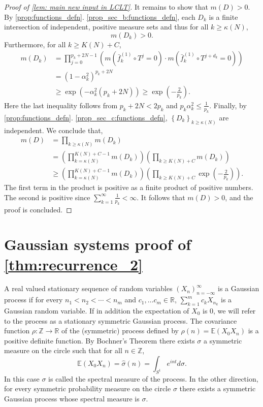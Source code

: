 \documentclass[12pt,reqno]{amsart}
\newcommand{\Z}{\mathbb{Z}}
\newcommand{\R}{\mathbb{R}}
\theoremstyle{definition}
\begin{document}
\begin{proof}[Proof of \cref{lem: main new input in LCLT}]
It remains to show that $m(D)>0$. By \cref{prop:functions_defn}. \ref{prop_sec_b:functions_defn}, each $D_k$ is a finite intersection of independent, positive measure sets and thus for all $k\geq \kappa(N)$, 
\[
m\left(D_k\right)>0. 
\]
Furthermore, for all $k\geq K(N)+C$,
\begin{align*}
m\left(D_k\right)&=\prod_{j=0}^{p_k+2N-1}\left(m\left(\bar{f}_k^{(1)}\circ T^{j}=0\right)\cdot m\left(\bar{f}_k^{(1)}\circ T^{j+d_k}=0\right)\right)\\
&=\left(1-\alpha_k^2\right)^{p_k+2N}\\
&\geq \exp\left(-\alpha_k^2(p_k+2N)\right)\geq \exp\left(-\frac{2}{p_k}\right).
\end{align*}
Here the last inequality follows from $p_k+2N<2p_k$ and $p_k\alpha_k^2\leq\frac{1}{p_k}$. Finally, by \cref{prop:functions_defn}. \ref{prop_sec_c:functions_defn}, $\left\{D_k\right\}_{k\geq \kappa(N)}$ are independent. We conclude that,
\begin{align*}
m(D)&=\prod_{k\geq \kappa(N)}m\left(D_k\right)\\
&=\left(\prod_{k= \kappa(N)}^{K(N)+C-1} m\left(D_k\right)\right)\left(\prod_{k\geq K(N)+C} m\left(D_k\right)\right)\\
&\geq \left(\prod_{k= \kappa(N)}^{K(N)+C-1} m\left(D_k\right)\right)\left(\prod_{k\geq K(N)+C} \exp\left(-\frac{2}{p_k}\right)\right).
\end{align*}
The first term in the product is positive as a finite product of positive numbers. The second is positive since $\sum_{k=1}^\infty\frac{1}{p_k}<\infty$. It follows that $m(D)>0$, and the proof is concluded. 
\end{proof}

\section{Gaussian systems proof of \cref{thm:recurrence_2}}\label{sec: Gaussian}

A real valued stationary sequence of random variables $\left(X_n\right)_{n=-\infty}^\infty$ is a Gaussian process if for every $n_1<n_2<\cdots<n_m$ and $c_1,\ldots c_m\in\R$, $\sum_{k=1}^mc_kX_{n_k}$ is a Gaussian random variable. If in addition the expectation of $X_0$ is $0$, we will refer to the process as a stationary symmetric Gaussian process. The covariance function $\rho:\Z\to\R$ of the (symmetric) process defined by $\rho(n)=\mathbb{E}\left(X_0X_n\right)$ is a positive definite function. By Bochner's Theorem there exists $\sigma$ a symmetric measure on the circle such that for all $n\in\Z$,
\[
\mathbb{E}\left(X_0X_n\right)=\hat{\sigma}(n)=\int_{S^1}e^{int}d\sigma. 
\]
In this case $\sigma$ is called the spectral measure of the process. In the other direction, for every symmetric probability measure on the circle $\sigma$ there exists a symmetric Gaussian process whose spectral measure is $\sigma$. 
\end{document}
